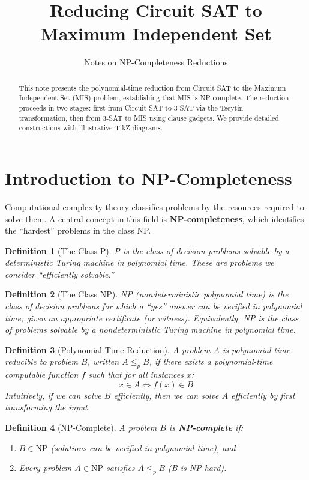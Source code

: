 \documentclass[11pt,a4paper]{article}
\title{Reducing Circuit SAT to Maximum Independent Set}
\author{Notes on NP-Completeness Reductions}
\date{}
\newtheorem{definition}{Definition}
\begin{document}
\maketitle

\begin{abstract}
This note presents the polynomial-time reduction from Circuit SAT to the Maximum Independent Set (MIS) problem, establishing that MIS is NP-complete. The reduction proceeds in two stages: first from Circuit SAT to 3-SAT via the Tseytin transformation, then from 3-SAT to MIS using clause gadgets. We provide detailed constructions with illustrative TikZ diagrams.
\end{abstract}

\section{Introduction to NP-Completeness}

Computational complexity theory classifies problems by the resources required to solve them. A central concept in this field is \textbf{NP-completeness}, which identifies the ``hardest'' problems in the class NP.

\begin{definition}[The Class P]
P is the class of decision problems solvable by a deterministic Turing machine in polynomial time. These are problems we consider ``efficiently solvable.''
\end{definition}

\begin{definition}[The Class NP]
NP (nondeterministic polynomial time) is the class of decision problems for which a ``yes'' answer can be \emph{verified} in polynomial time, given an appropriate certificate (or witness). Equivalently, NP is the class of problems solvable by a nondeterministic Turing machine in polynomial time.
\end{definition}

\begin{definition}[Polynomial-Time Reduction]
A problem $A$ is \emph{polynomial-time reducible} to problem $B$, written $A \leq_p B$, if there exists a polynomial-time computable function $f$ such that for all instances $x$:
\[
x \in A \iff f(x) \in B
\]
Intuitively, if we can solve $B$ efficiently, then we can solve $A$ efficiently by first transforming the input.
\end{definition}

\begin{definition}[NP-Complete]
A problem $B$ is \textbf{NP-complete} if:
\begin{enumerate}
    \item $B \in \mathrm{NP}$ (solutions can be verified in polynomial time), and
    \item Every problem $A \in \mathrm{NP}$ satisfies $A \leq_p B$ (B is NP-hard).
\end{enumerate}
\end{definition}
\end{document}
